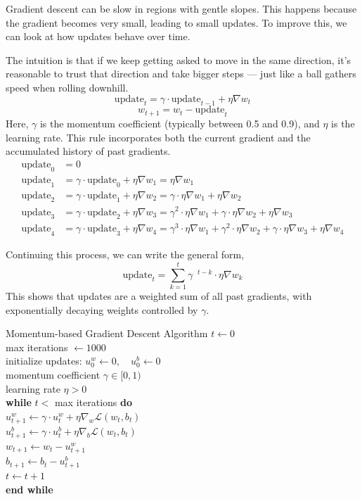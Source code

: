 Gradient descent can be slow in regions with gentle slopes. This happens because the gradient becomes very small, leading to small updates. To improve this, we can look at how updates behave over time.

The intuition is that if we keep getting asked to move in the same direction, it's reasonable to trust that direction and take bigger steps --- just like a ball gathers speed when rolling downhill.
\[
\text{update}_t = \gamma \cdot \text{update}_{t-1} + \eta \nabla w_t  
\]
\[
w_{t+1} = w_t - \text{update}_t
\]
Here, $\gamma$ is the momentum coefficient (typically between 0.5 and 0.9), and $\eta$ is the learning rate. This rule incorporates both the current gradient and the accumulated history of past gradients.
\begin{align*}
\text{update}_0 &= 0 \\
\text{update}_1 &= \gamma \cdot \text{update}_0 + \eta \nabla w_1 = \eta \nabla w_1 \\
\text{update}_2 &= \gamma \cdot \text{update}_1 + \eta \nabla w_2 = \gamma \cdot \eta \nabla w_1 + \eta \nabla w_2 \\
\text{update}_3 &= \gamma \cdot \text{update}_2 + \eta \nabla w_3 = \gamma^2 \cdot \eta \nabla w_1 + \gamma \cdot \eta \nabla w_2 + \eta \nabla w_3 \\
\text{update}_4 &= \gamma \cdot \text{update}_3 + \eta \nabla w_4 = \gamma^3 \cdot \eta \nabla w_1 + \gamma^2 \cdot \eta \nabla w_2 + \gamma \cdot \eta \nabla w_3 + \eta \nabla w_4
\end{align*}

Continuing this process, we can write the general form, 
\[
\text{update}_t = \sum_{k=1}^{t} \gamma^{\text{ }t-k} \cdot \eta \nabla w_k
\] 
This shows that updates are a weighted sum of all past gradients, with exponentially decaying weights controlled by $\gamma$.

\begin{algobox}{Momentum-based Gradient Descent Algorithm}
\( t \gets 0 \) \\
max iterations \( \gets 1000 \) \\
initialize updates: \( u^w_0 \gets 0, \quad u^b_0 \gets 0 \) \\
momentum coefficient \( \gamma \in [0,1) \) \\
learning rate \( \eta > 0 \) \\
\textbf{while} \( t < \) max iterations \textbf{do} \\
\hspace*{1em} \( u^w_{t+1} \gets \gamma \cdot u^w_t + \eta \nabla_w \mathcal{L}(w_t, b_t) \) \\
\hspace*{1em} \( u^b_{t+1} \gets \gamma \cdot u^b_t + \eta \nabla_b \mathcal{L}(w_t, b_t) \) \\
\hspace*{1em} \( w_{t+1} \gets w_t - u^w_{t+1} \) \\
\hspace*{1em} \( b_{t+1} \gets b_t - u^b_{t+1} \) \\
\hspace*{1em} \( t \gets t + 1 \) \\
\textbf{end while}
\end{algobox}


